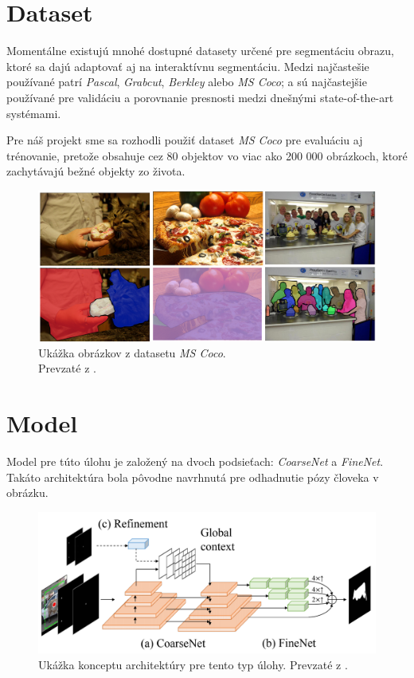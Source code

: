 \documentclass [11pt, a4paper, twocolumn]{article}
\begin{document}
\section{Dataset}
Momentálne existujú mnohé dostupné datasety určené pre segmentáciu obrazu, ktoré sa dajú adaptovať aj na interaktívnu segmentáciu. Medzi najčastešie používané patrí \textit{Pascal}, \textit{Grabcut}, \textit{Berkley} alebo \textit{MS Coco}; a sú najčastejšie používané pre validáciu a porovnanie presnosti medzi dnešnými state-of-the-art systémami.

Pre náš projekt sme sa rozhodli použiť dataset \textit{MS Coco} pre evaluáciu aj trénovanie, pretože obsahuje cez 80 objektov vo viac ako 200 000 obrázkoch, ktoré zachytávajú bežné objekty zo života.

\begin{figure}[H]
\centering
\includegraphics[width=\linewidth]{coco}
\caption{Ukážka obrázkov z datasetu \textit{MS Coco}. \\Prevzaté z \cite{coco}.}
\end{figure}

\section{Model}

Model pre túto úlohu je založený na dvoch podsieťach: \textit{CoarseNet} a \textit{FineNet}. Takáto architektúra bola pôvodne navrhnutá pre odhadnutie pózy človeka v obrázku. 

\begin{figure}[H]
\centering
\includegraphics[width=\linewidth]{architecture}
\caption{Ukážka konceptu architektúry pre tento typ úlohy. Prevzaté z \cite{zhang_liew_wei_wei_zhao_2020}.}
\end{figure}
\end{document}
